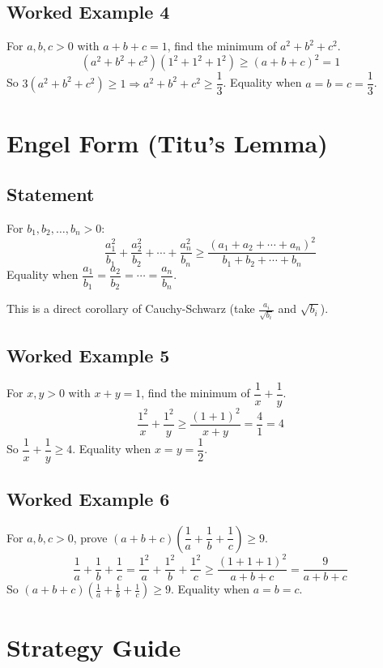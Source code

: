 \documentclass{article}
\begin{document}
\subsection{Worked Example 4}
For $a, b, c > 0$ with $a + b + c = 1$, find the minimum of $a^2 + b^2 + c^2$.
\[
(a^2 + b^2 + c^2)(1^2 + 1^2 + 1^2) \geq (a + b + c)^2 = 1
\]
So $3(a^2 + b^2 + c^2) \geq 1 \Rightarrow a^2 + b^2 + c^2 \geq \dfrac{1}{3}$.
Equality when $a = b = c = \dfrac{1}{3}$.

\newpage

\section{Engel Form (Titu's Lemma)}

\subsection{Statement}
For $b_1, b_2, \dots, b_n > 0$:
\[
\frac{a_1^2}{b_1} + \frac{a_2^2}{b_2} + \cdots + \frac{a_n^2}{b_n} \geq \frac{(a_1 + a_2 + \cdots + a_n)^2}{b_1 + b_2 + \cdots + b_n}
\]
Equality when $\dfrac{a_1}{b_1} = \dfrac{a_2}{b_2} = \cdots = \dfrac{a_n}{b_n}$.

This is a direct corollary of Cauchy-Schwarz (take $\frac{a_i}{\sqrt{b_i}}$ and $\sqrt{b_i}$).

\subsection{Worked Example 5}
For $x, y > 0$ with $x + y = 1$, find the minimum of $\dfrac{1}{x} + \dfrac{1}{y}$.
\[
\frac{1^2}{x} + \frac{1^2}{y} \geq \frac{(1 + 1)^2}{x + y} = \frac{4}{1} = 4
\]
So $\dfrac{1}{x} + \dfrac{1}{y} \geq 4$. Equality when $x = y = \dfrac{1}{2}$.

\subsection{Worked Example 6}
For $a, b, c > 0$, prove $(a + b + c)\left(\dfrac{1}{a} + \dfrac{1}{b} + \dfrac{1}{c}\right) \geq 9$.
\[
\frac{1}{a} + \frac{1}{b} + \frac{1}{c} = \frac{1^2}{a} + \frac{1^2}{b} + \frac{1^2}{c} \geq \frac{(1+1+1)^2}{a+b+c} = \frac{9}{a+b+c}
\]
So $(a+b+c)\left(\frac{1}{a} + \frac{1}{b} + \frac{1}{c}\right) \geq 9$.
Equality when $a = b = c$.

\newpage

\section{Strategy Guide}
\end{document}

